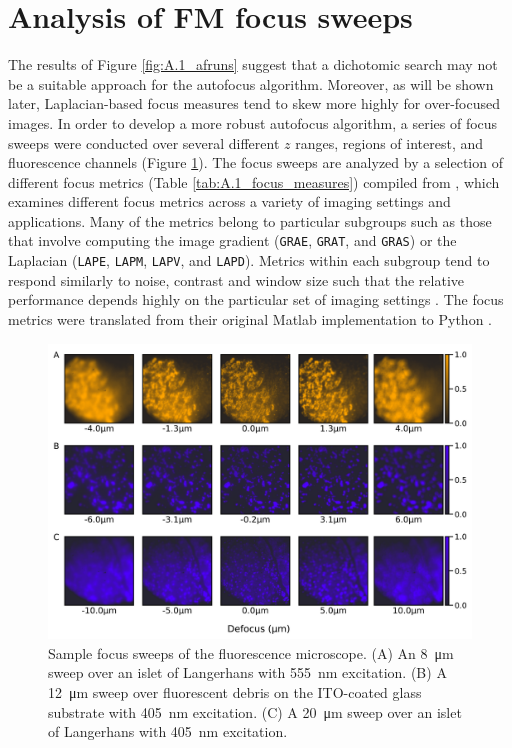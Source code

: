 \section{Analysis of FM focus sweeps}
The results of Figure \ref{fig:A.1_afruns} suggest that a dichotomic search may not be a suitable approach for the autofocus algorithm. Moreover, as will be shown later, Laplacian-based focus measures tend to skew more highly for over-focused images. In order to develop a more robust autofocus algorithm, a series of focus sweeps were conducted over several different $z$ ranges, regions of interest, and fluorescence channels (Figure \ref{fig:A.2_sweeps}). The focus sweeps are analyzed by a selection of different focus metrics (Table \ref{tab:A.1_focus_measures}) compiled from \textcite{pertuz2013analysis}, which examines different focus metrics across a variety of imaging settings and applications. Many of the metrics belong to particular subgroups such as those that involve computing the image gradient (\texttt{GRAE}, \texttt{GRAT}, and \texttt{GRAS}) or the Laplacian (\texttt{LAPE}, \texttt{LAPM}, \texttt{LAPV}, and \texttt{LAPD}). Metrics within each subgroup tend to respond similarly to noise, contrast and window size such that the relative performance depends highly on the particular set of imaging settings \cite{pertuz2013analysis}. The focus metrics were translated from their original Matlab implementation \cite{pertuz2017focus} to Python \cite{Lane_focus-metrics_2022}.

\begin{figure}[!tb]
    \centering
    \includegraphics[width=\linewidth]{cppendix-A/figures/figA-2_sweeps.pdf}
    \caption{Sample focus sweeps of the fluorescence microscope.
    (A) An \SI{8}{\micro\meter} sweep over an islet of Langerhans with \SI{555}{\nano\meter} excitation.
    (B) A \SI{12}{\micro\meter} sweep over fluorescent debris on the ITO-coated glass substrate with \SI{405}{\nano\meter} excitation.
    (C) A \SI{20}{\micro\meter} sweep over an islet of Langerhans with \SI{405}{\nano\meter} excitation.}
    \label{fig:A.2_sweeps}
\end{figure}

